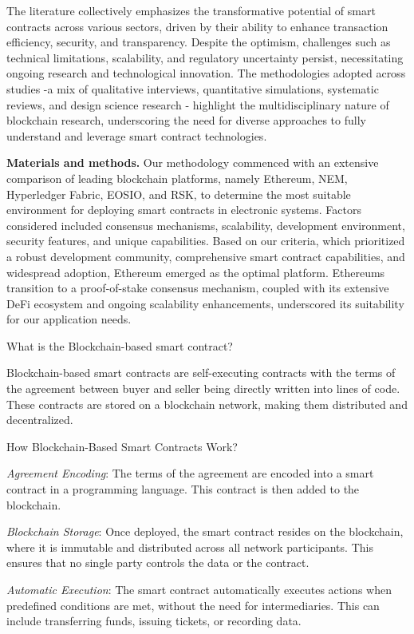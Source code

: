 The literature collectively emphasizes the transformative potential of
smart contracts across various sectors, driven by their ability to
enhance transaction efficiency, security, and transparency. Despite the
optimism, challenges such as technical limitations, scalability, and
regulatory uncertainty persist, necessitating ongoing research and
technological innovation. The methodologies adopted across studies -a
mix of qualitative interviews, quantitative simulations, systematic
reviews, and design science research - highlight the multidisciplinary
nature of blockchain research, underscoring the need for diverse
approaches to fully understand and leverage smart contract technologies.

{\bfseries Materials and methods.} Our methodology commenced with an
extensive comparison of leading blockchain platforms, namely Ethereum,
NEM, Hyperledger Fabric, EOSIO, and RSK, to determine the most suitable
environment for deploying smart contracts in electronic systems. Factors
considered included consensus mechanisms, scalability, development
environment, security features, and unique capabilities. Based on our
criteria, which prioritized a robust development community,
comprehensive smart contract capabilities, and widespread adoption,
Ethereum emerged as the optimal platform. Ethereum\textquotesingle s
transition to a proof-of-stake consensus mechanism, coupled with its
extensive DeFi ecosystem and ongoing scalability enhancements,
underscored its suitability for our application needs.

What is the Blockchain-based smart contract?

Blockchain-based smart contracts are self-executing contracts with the
terms of the agreement between buyer and seller being directly written
into lines of code. These contracts are stored on a blockchain network,
making them distributed and decentralized.

How Blockchain-Based Smart Contracts Work?

\emph{Agreement Encoding}: The terms of the agreement are encoded into a
smart contract in a programming language. This contract is then added to
the blockchain.

\emph{Blockchain Storage}: Once deployed, the smart contract resides on
the blockchain, where it is immutable and distributed across all network
participants. This ensures that no single party controls the data or the
contract.

\emph{Automatic Execution}: The smart contract automatically executes
actions when predefined conditions are met, without the need for
intermediaries. This can include transferring funds, issuing tickets, or
recording data.

